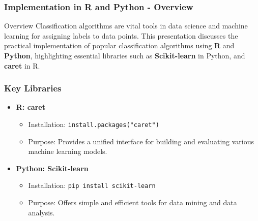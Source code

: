 \documentclass{beamer}
\begin{document}
\begin{frame}[fragile]
    \frametitle{Implementation in R and Python - Overview}
    \begin{block}{Overview}
        Classification algorithms are vital tools in data science and machine learning for assigning labels to data points. This presentation discusses the practical implementation of popular classification algorithms using \textbf{R} and \textbf{Python}, highlighting essential libraries such as \textbf{Scikit-learn} in Python, and \textbf{caret} in R.
    \end{block}
\end{frame}

\begin{frame}[fragile]
    \frametitle{Key Libraries}
    \begin{itemize}
        \item \textbf{R: caret}
        \begin{itemize}
            \item Installation: \texttt{install.packages("caret")}
            \item Purpose: Provides a unified interface for building and evaluating various machine learning models.
        \end{itemize}
        
        \item \textbf{Python: Scikit-learn}
        \begin{itemize}
            \item Installation: \texttt{pip install scikit-learn}
            \item Purpose: Offers simple and efficient tools for data mining and data analysis.
        \end{itemize}
    \end{itemize}
\end{frame}
\end{document}
